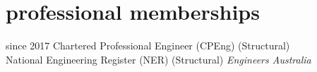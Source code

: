 \section{professional memberships}
\begin{entrylist}
\entry%
{since 2017}
{Chartered Professional Engineer {\normalfont (CPEng) (Structural)}\\
National Engineering Register {\normalfont (NER) (Structural)}}%
{}
{\emph{Engineers Australia}
}
\end{entrylist}